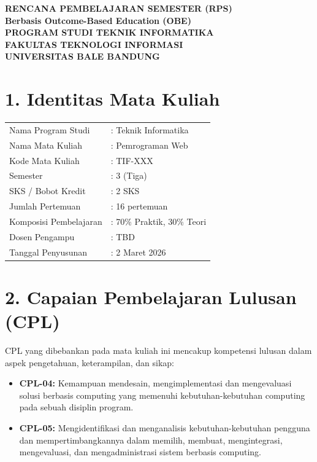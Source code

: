 \documentclass[12pt,a4paper]{article}
\begin{document}
\begin{center}
\textbf{\Large RENCANA PEMBELAJARAN SEMESTER (RPS)}\\
\textbf{Berbasis Outcome-Based Education (OBE)}\\[0.5cm]
\textbf{PROGRAM STUDI TEKNIK INFORMATIKA}\\
\textbf{FAKULTAS TEKNOLOGI INFORMASI}\\
\textbf{UNIVERSITAS BALE BANDUNG}\\
\end{center}

\vspace{1cm}

\section*{1. Identitas Mata Kuliah}
\begin{tabular}{ll}
Nama Program Studi & : Teknik Informatika \\
Nama Mata Kuliah & : Pemrograman Web \\
Kode Mata Kuliah & : TIF-XXX \\
Semester & : 3 (Tiga) \\
SKS / Bobot Kredit & : 2 SKS \\
Jumlah Pertemuan & : 16 pertemuan \\
Komposisi Pembelajaran & : 70\% Praktik, 30\% Teori \\
Dosen Pengampu & : TBD \\
Tanggal Penyusunan & : 2 Maret 2026 \\
\end{tabular}

\vspace{0.5cm}

\section*{2. Capaian Pembelajaran Lulusan (CPL)}

CPL yang dibebankan pada mata kuliah ini mencakup kompetensi lulusan dalam aspek pengetahuan, keterampilan, dan sikap:

\begin{itemize}[leftmargin=*]
  \item \textbf{CPL-04:} Kemampuan mendesain, mengimplementasi dan mengevaluasi solusi berbasis computing yang memenuhi kebutuhan-kebutuhan computing pada sebuah disiplin program.
  \item \textbf{CPL-05:} Mengidentifikasi dan menganalisis kebutuhan-kebutuhan pengguna dan mempertimbangkannya dalam memilih, membuat, mengintegrasi, mengevaluasi, dan mengadministrasi sistem berbasis computing.
\end{itemize}
\end{document}
